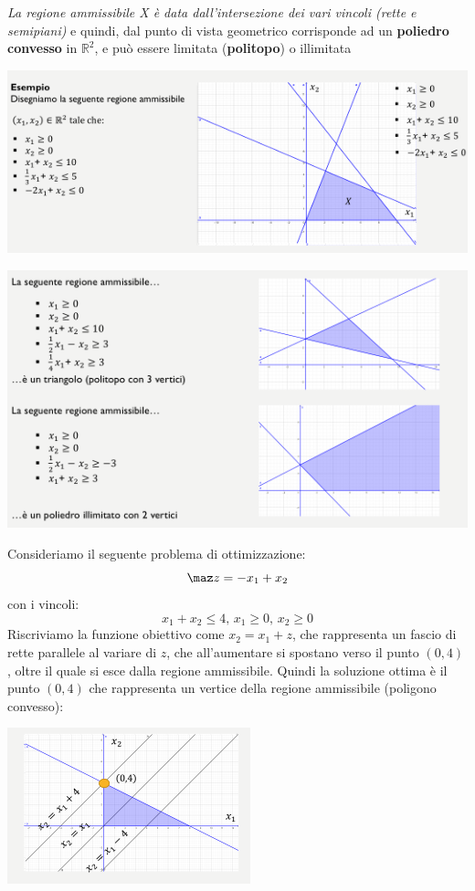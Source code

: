 \message{ !name(ro.tex)}\documentclass[a4paper,12pt, oneside]{book}
\begin{document}
\textit{La regione ammissibile X è data dall’intersezione dei vari
  vincoli (rette e semipiani)} e quindi, dal punto di vista geometrico
corrisponde ad un \textbf{poliedro convesso} in $\mathbb{R}^2$, e può
essere limitata (\textbf{politopo}) o illimitata
\begin{center}
  \includegraphics[scale = 0.7]{img/2d1.png}
\end{center}
\begin{center}
  \includegraphics[scale = 0.7]{img/2d2.png}
\end{center}
\begin{esempio}
  Consideriamo il seguente problema di ottimizzazione:
  \[\maz z = -x_1+x_2\]
  con i vincoli:
  \[x_1+x_2\leq 4,\, x_1\geq 0,\, x_2\geq 0\]
  Riscriviamo la funzione obiettivo come $x_2=x_1+z$, che
  rappresenta un fascio di rette parallele al variare di $z$, che
  all'aumentare si spostano verso il punto $(0,4)$, oltre il quale si
  esce dalla regione ammissibile. Quindi la soluzione ottima è il punto
  $(0,4)$ che rappresenta un vertice della regione ammissibile (poligono
  convesso):
  \begin{center}
    \includegraphics[scale = 0.7]{img/2d3.png}
  \end{center}
\end{esempio}
\end{document}
